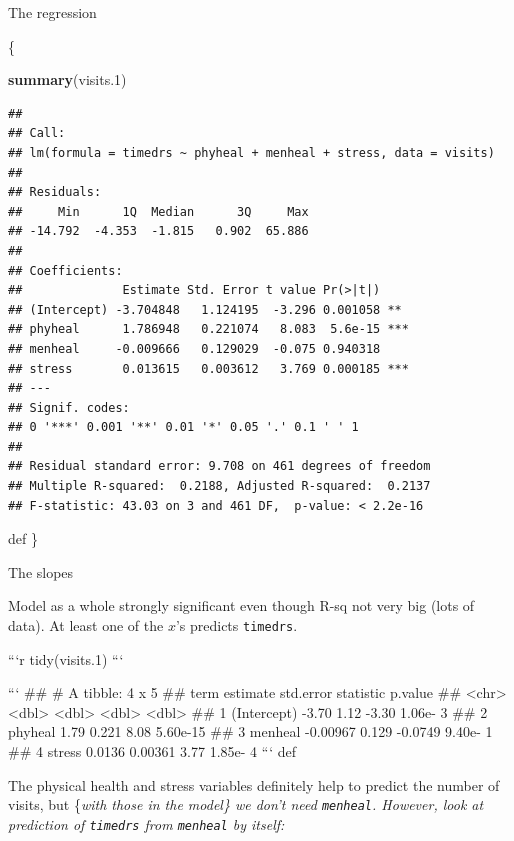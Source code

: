 \documentclass[ignorenonframetext,]{beamer}
\newenvironment{Shaded}{\begin{snugshade}}{\end{snugshade}}
\newcommand{\FloatTok}[1]{\textcolor[rgb]{0.00,0.00,0.81}{#1}}
\newcommand{\KeywordTok}[1]{\textcolor[rgb]{0.13,0.29,0.53}{\textbf{#1}}}
\newcommand{\NormalTok}[1]{#1}
\begin{document}
\begin{frame}[fragile]{The regression}
\protect\hypertarget{the-regression-1}{}

\{\scriptsize

\begin{Shaded}
\begin{Highlighting}[]
\KeywordTok{summary}\NormalTok{(visits}\FloatTok{.1}\NormalTok{)}
\end{Highlighting}
\end{Shaded}

\begin{verbatim}
## 
## Call:
## lm(formula = timedrs ~ phyheal + menheal + stress, data = visits)
## 
## Residuals:
##     Min      1Q  Median      3Q     Max 
## -14.792  -4.353  -1.815   0.902  65.886 
## 
## Coefficients:
##              Estimate Std. Error t value Pr(>|t|)    
## (Intercept) -3.704848   1.124195  -3.296 0.001058 ** 
## phyheal      1.786948   0.221074   8.083  5.6e-15 ***
## menheal     -0.009666   0.129029  -0.075 0.940318    
## stress       0.013615   0.003612   3.769 0.000185 ***
## ---
## Signif. codes:  
## 0 '***' 0.001 '**' 0.01 '*' 0.05 '.' 0.1 ' ' 1
## 
## Residual standard error: 9.708 on 461 degrees of freedom
## Multiple R-squared:  0.2188, Adjusted R-squared:  0.2137 
## F-statistic: 43.03 on 3 and 461 DF,  p-value: < 2.2e-16
\end{verbatim}

def \}

\end{frame}

\begin{frame}[fragile]{The slopes}
\protect\hypertarget{the-slopes}{}

Model as a whole strongly significant even though R-sq not very big
(lots of data). At least one of the \(x\)'s predicts \texttt{timedrs}.

\begin{footnotesize}

```r
tidy(visits.1)
```

```
## # A tibble: 4 x 5
##   term        estimate std.error statistic  p.value
##   <chr>          <dbl>     <dbl>     <dbl>    <dbl>
## 1 (Intercept) -3.70      1.12      -3.30   1.06e- 3
## 2 phyheal      1.79      0.221      8.08   5.60e-15
## 3 menheal     -0.00967   0.129     -0.0749 9.40e- 1
## 4 stress       0.0136    0.00361    3.77   1.85e- 4
```
def 
\end{footnotesize}

The physical health and stress variables definitely help to predict the
number of visits, but \{\em with those in the model\} we don't need
\texttt{menheal}. However, look at prediction of \texttt{timedrs} from
\texttt{menheal} by itself:

\end{frame}
\end{document}

